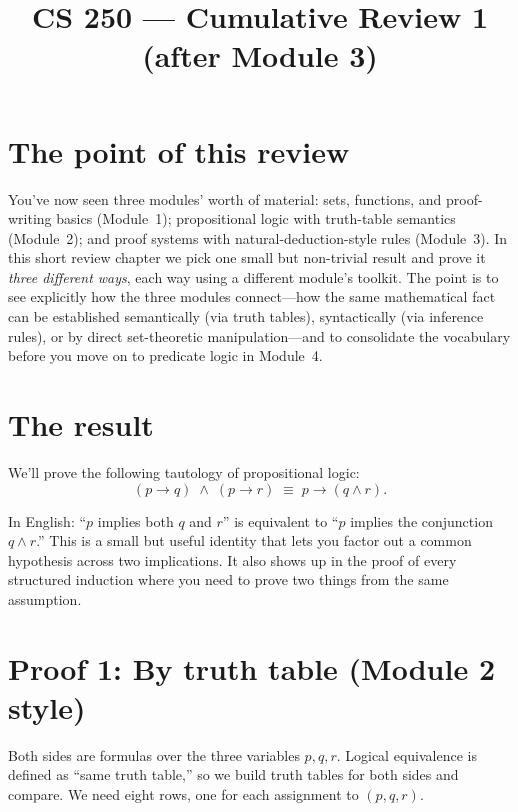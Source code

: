 \documentclass[11pt]{article}
\title{CS 250 --- Cumulative Review 1 (after Module 3)}
\author{}
\date{}
\begin{document}
\maketitle

\section*{The point of this review}

You've now seen three modules' worth of material: sets, functions, and proof-writing basics (Module~1); propositional logic with truth-table semantics (Module~2); and proof systems with natural-deduction-style rules (Module~3). In this short review chapter we pick one small but non-trivial result and prove it \emph{three different ways}, each way using a different module's toolkit. The point is to see explicitly how the three modules connect---how the same mathematical fact can be established semantically (via truth tables), syntactically (via inference rules), or by direct set-theoretic manipulation---and to consolidate the vocabulary before you move on to predicate logic in Module~4.

\section*{The result}

We'll prove the following tautology of propositional logic:
\[
  (p \to q) \;\wedge\; (p \to r) \;\equiv\; p \to (q \wedge r).
\]

In English: ``$p$ implies both $q$ and $r$'' is equivalent to ``$p$ implies the conjunction $q \wedge r$.'' This is a small but useful identity that lets you factor out a common hypothesis across two implications. It also shows up in the proof of every structured induction where you need to prove two things from the same assumption.

\section*{Proof 1: By truth table (Module 2 style)}

Both sides are formulas over the three variables $p, q, r$. Logical equivalence is defined as ``same truth table,'' so we build truth tables for both sides and compare. We need eight rows, one for each assignment to $(p, q, r)$.
\end{document}
